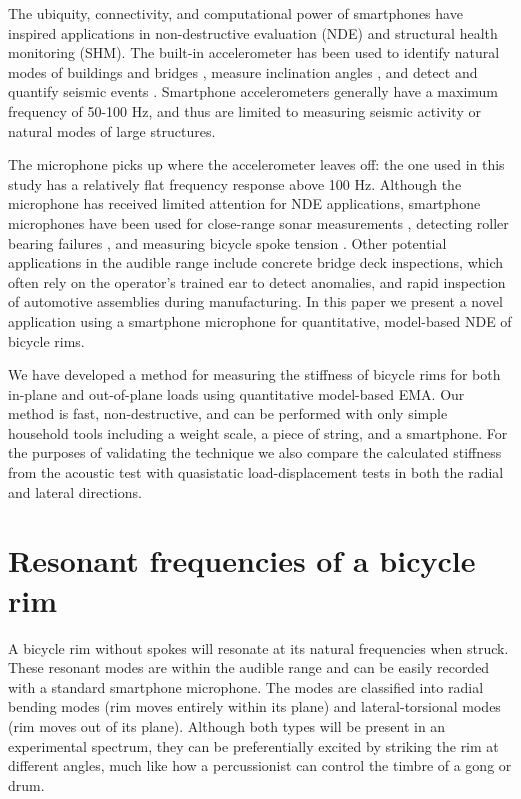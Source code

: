 \documentclass[../thesis.tex]{subfiles}
\begin{document}
The ubiquity, connectivity, and computational power of smartphones have inspired applications in non-destructive evaluation (NDE) and structural health monitoring (SHM). The built-in accelerometer has been used to identify natural modes of buildings and bridges \cite{Feng2015}, measure inclination angles \cite{Morgenthal2012}, and detect and quantify seismic events \cite{Kong2016}. Smartphone accelerometers generally have a maximum frequency of 50-100 Hz, and thus are limited to measuring seismic activity or natural modes of large structures.

The microphone picks up where the accelerometer leaves off: the one used in this study has a relatively flat frequency response above 100 Hz. Although the microphone has received limited attention for NDE applications, smartphone microphones have been used for close-range sonar measurements \cite{Morgenthal2012}, detecting roller bearing failures \cite{Grebenik2016}, and measuring bicycle spoke tension \cite{Pepelko2016}. Other potential applications in the audible range include concrete bridge deck inspections, which often rely on the operator's trained ear to detect anomalies, and rapid inspection of automotive assemblies during manufacturing. In this paper we present a novel application using a smartphone microphone for quantitative, model-based NDE of bicycle rims.

We have developed a method for measuring the stiffness of bicycle rims for both in-plane and out-of-plane loads using quantitative model-based EMA. Our method is fast, non-destructive, and can be performed with only simple household tools including a weight scale, a piece of string, and a smartphone. For the purposes of validating the technique we also compare the calculated stiffness from the acoustic test with quasistatic load-displacement tests in both the radial and lateral directions.


\section{Resonant frequencies of a bicycle rim}

A bicycle rim without spokes will resonate at its natural frequencies when struck. These resonant modes are within the audible range and can be easily recorded with a standard smartphone microphone. The modes are classified into radial bending modes (rim moves entirely within its plane) and lateral-torsional modes (rim moves out of its plane). Although both types will be present in an experimental spectrum, they can be preferentially excited by striking the rim at different angles, much like how a percussionist can control the timbre of a gong or drum.
\end{document}
